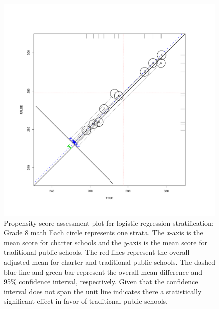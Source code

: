 \begin{figure}[h!]
\begin{center}
\includegraphics[trim=0 .7in 0 .7in]{../Figures2009/g8math-circpsa10.pdf}
\caption[Propensity score assessment plot for logistic regression stratification: Grade 8 math]{Propensity score assessment plot for logistic regression stratification: Grade 8 math Each circle represents one strata. The \textit{x}-axis is the mean score for charter schools and the \textit{y}-axis is the mean score for traditional public schools. The red lines represent the overall adjusted mean for charter and traditional public schools. The dashed blue line and green bar represent the overall mean difference and 95\% confidence interval, respectively. Given that the confidence interval does not span the unit line indicates there a statistically significant effect in favor of traditional public schools.}
\end{center}
\end{figure}

\clearpage



